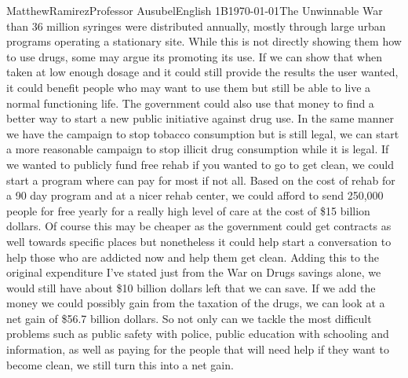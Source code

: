 \documentclass[12pt,letterpaper]{article}
\begin{document}
\begin{mla}{Matthew}{Ramirez}{Professor Ausubel}{English 1B}{\today}{The Unwinnable War}
than 36 million syringes were distributed annually, mostly through large urban programs operating a stationary site. While this is not directly showing them how to use drugs, some may argue its promoting its use. If we can show that when taken at low enough dosage and it could still provide the results the user wanted, it could benefit people who may want to use them but still be able to live a normal functioning life. The government could also use that money to find a better way to start a new public initiative against drug use. In the same manner we have the campaign to stop tobacco consumption but is still legal, we can start a more reasonable campaign to stop illicit drug consumption while it is legal. If we wanted to publicly fund free rehab if you wanted to go to get clean, we could start a program where can pay for most if not all. Based on the cost of rehab for a 90 day program and at a nicer rehab center, we could afford to send 250,000 people for free yearly for a really high level of care at the cost of \$15 billion dollars. Of course this may be cheaper as the government could get contracts as well towards specific places but nonetheless it could help start a conversation to help those who are addicted now and help them get clean. Adding this to the original expenditure I've stated just from the War on Drugs savings alone, we would still have about \$10 billion dollars left that we can save. If we add the money we could possibly gain from the taxation of the drugs, we can look at a net gain of \$56.7 billion dollars. So not only can we tackle the most difficult problems such as public safety with police, public education with schooling and information, as well as paying for the people that will need help if they want to become clean, we still turn this into a net gain.\\
\label{Conclusion}

\end{mla}
\end{document}
